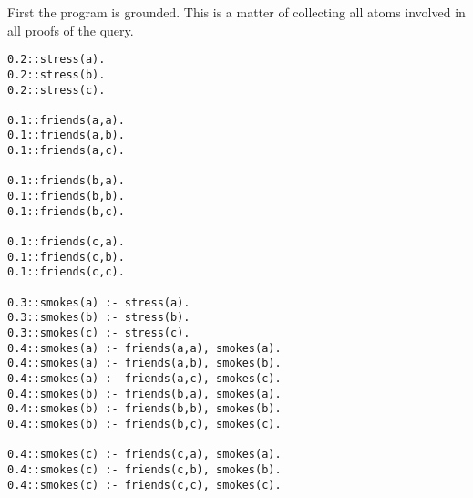 


First the program is grounded. This is a matter of collecting all atoms involved in all proofs of the query.

\begin{code}
\begin{verbatim}
0.2::stress(a).
0.2::stress(b).
0.2::stress(c).

0.1::friends(a,a).
0.1::friends(a,b).
0.1::friends(a,c).

0.1::friends(b,a).
0.1::friends(b,b).
0.1::friends(b,c).

0.1::friends(c,a).
0.1::friends(c,b).
0.1::friends(c,c).

0.3::smokes(a) :- stress(a).
0.3::smokes(b) :- stress(b).
0.3::smokes(c) :- stress(c).
0.4::smokes(a) :- friends(a,a), smokes(a).
0.4::smokes(a) :- friends(a,b), smokes(b).
0.4::smokes(a) :- friends(a,c), smokes(c).
0.4::smokes(b) :- friends(b,a), smokes(a).
0.4::smokes(b) :- friends(b,b), smokes(b).
0.4::smokes(b) :- friends(b,c), smokes(c).

0.4::smokes(c) :- friends(c,a), smokes(a).
0.4::smokes(c) :- friends(c,b), smokes(b).
0.4::smokes(c) :- friends(c,c), smokes(c).
\end{verbatim}
\label{code:base}
\vspace{0.5cm}
\end{code}

